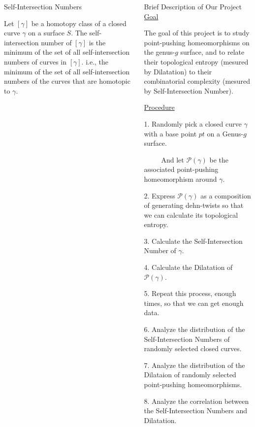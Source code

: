 \documentclass[leqno,presentation]{beamer}
\begin{document}
\begin{frame}
\begin{columns}[t]
\begin{column}[t]{.25\linewidth}
\begin{block}{Self-Intersection Numbers}
\begin{itemize}
Let $[\gamma]$ be a homotopy class of a closed curve $\gamma$ on a surface $S$. The self-intersection number of $[\gamma]$ is the minimum of the set of all self-intersection numbers of curves in $[\gamma]$. i.e., the minimum of the set of all self-intersection numbers of the curves that are homotopic to $\gamma$.
\end{itemize}
\end{block}

\end{column}

\begin{column}{.45\linewidth}

\begin{block}{Brief Description of Our Project}
\vspace{1ex}
\underline{Goal}

The goal of this project is to study point-pushing homeomorphisms on the genus-$g$ surface, and to relate their topological entropy (mesured by Dilatation) to their combinatorial complexity (mesured by Self-Intersection Number).
 
\underline{Procedure}

1. Randomly pick a closed curve $\gamma$ with a base point $pt$ on a Genus-$g$ surface.

~~~~~And let $\mathcal{P}(\gamma)$ be the associated point-pushing homeomorphism around $\gamma$.

2. Express $\mathcal{P}(\gamma)$ as a composition of generating dehn-twists so that we can calculate its topological entropy.

3. Calculate the Self-Intersection Number of $\gamma$.

4. Calculate the Dilatation of $\mathcal{P}(\gamma)$.

5. Repeat this process, enough times, so that we can get enough data.

6. Analyze the distribution of the Self-Intersection Numbers of randomly selected closed curves.

7. Analyze the distribution of the Dilataion of randomly selected point-pushing homeomorphisms.

8. Analyze the correlation between the Self-Intersection Numbers and Dilatation.

\end{block}


\end{column}
\end{columns}
\end{frame}
\end{document}
